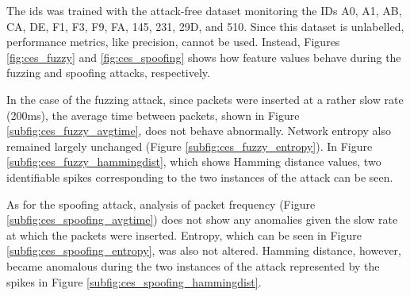 The \gls{ids} was trained with the attack-free dataset monitoring the IDs A0, A1, AB, CA, DE, F1, F3, F9, FA, 145, 231, 29D, and 510. Since this dataset is unlabelled, performance metrics, like precision, cannot be used. Instead, Figures \ref{fig:ces_fuzzy} and \ref{fig:ces_spoofing} shows how feature values behave during the fuzzing and spoofing attacks, respectively.\par
In the case of the fuzzing attack, since packets were inserted at a rather slow rate (200ms), the average time between packets, shown in Figure \ref{subfig:ces_fuzzy_avgtime}, does not behave abnormally. Network entropy also remained largely unchanged (Figure \ref{subfig:ces_fuzzy_entropy}). In Figure \ref{subfig:ces_fuzzy_hammingdist}, which shows Hamming distance values, two identifiable spikes corresponding to the two instances of the attack can be seen.\par
As for the spoofing attack, analysis of packet frequency (Figure \ref{subfig:ces_spoofing_avgtime}) does not show any anomalies given the slow rate at which the packets were inserted. Entropy, which can be seen in Figure \ref{subfig:ces_spoofing_entropy}, was also not altered. Hamming distance, however, became anomalous during the two instances of the attack represented by the spikes in Figure \ref{subfig:ces_spoofing_hammingdist}.

